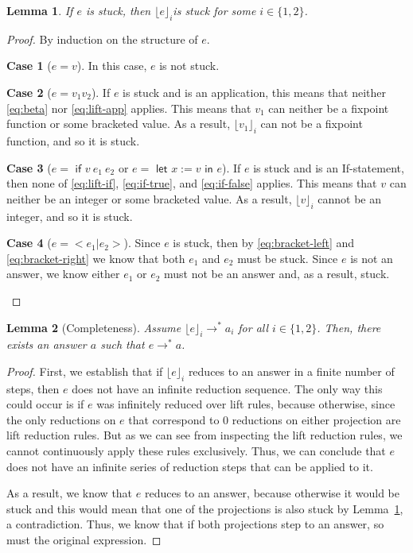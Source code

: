 \documentclass[a4paper,twocolumn]{article}
\newcommand{\lift}[1]{\lfloor #1 \rfloor}
\theoremstyle{plain}
\newtheorem{lemma}{Lemma}
\theoremstyle{definition}
\newtheorem*{case}{Case}
\begin{document}
\begin{lemma}
  \label{lem:stuck_bracket}
  If $e$ is stuck, then $\lift{e}_i$is stuck for some $i \in \{1, 2\}$.
\end{lemma}
\begin{proof}
  By induction on the structure of $e$.

  \begin{case}[$e = v$]
    In this case, $e$ is not stuck.
  \end{case}

  \begin{case}[$e = v_1 v_2$]
    If $e$ is stuck and is an application, this means that neither
    \ref{eq:beta} nor \ref{eq:lift-app} applies.  This means that $v_1$ can
    neither be a fixpoint function or some bracketed value.  As a result,
    $\lift{v_1}_i$ can not be a fixpoint function, and so it is stuck.
  \end{case}

  \begin{case}[$e = \textsf{ if } v \: e_1 \: e_2$ or $e =
    \textsf{ let } x := v \textsf{ in } e$]
    If $e$ is stuck and is an If-statement, then none of \ref{eq:lift-if}, \ref{eq:if-true}, and \ref{eq:if-false} applies. This means that $v$ can neither
    be an integer or some bracketed value.  As a result, $\lift{v}_i$ cannot
    be an integer, and so it is stuck.
  \end{case}

  \begin{case}[$e = < e_1 | e_2 >$]
    Since $e$ is stuck, then by \ref{eq:bracket-left} and \ref{eq:bracket-right}
    we know that both $e_1$ and $e_2$ must be stuck.  Since $e$ is not an
    answer, we know either $e_1$ or $e_2$ must not be an answer and, as a
    result, stuck.
  \end{case}
\end{proof}

\begin{lemma}[Completeness]
  \label{lem:completeness}
  Assume $\lift{e}_i \to^* a_i$ for all $i \in \{1, 2\}$.  Then, there exists an
  answer $a$ such that $e \to^* a$.
\end{lemma}
\begin{proof}
  First, we establish that if $\lift{e}_i$ reduces to an answer in a finite
  number of steps, then $e$ does not have an infinite reduction sequence.  The
  only way this could occur is if $e$ was infinitely reduced over lift rules,
  because otherwise, since the only reductions on $e$ that correspond to 0
  reductions on either projection are lift reduction rules.  But as we can see
  from inspecting the lift reduction rules, we cannot continuously apply these
  rules exclusively.  Thus, we can conclude that $e$ does not have an infinite
  series of reduction steps that can be applied to it.

  As a result, we know that $e$ reduces to an answer, because otherwise it would
  be stuck and this would mean that one of the projections is also stuck by
  Lemma~\ref{lem:stuck_bracket}, a contradiction.  Thus, we know that if both
  projections step to an answer, so must the original expression.
\end{proof}
\end{document}
